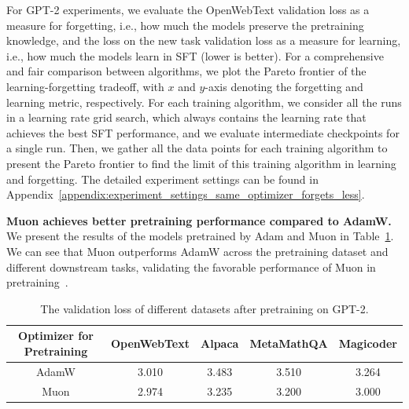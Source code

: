 \documentclass{article}
\theoremstyle{remark}
\begin{document}
For GPT-2 experiments, we evaluate the OpenWebText validation loss as a measure for forgetting, i.e., how much the models preserve the pretraining knowledge, and the loss on the new task validation loss as a measure for learning, i.e., how much the models learn in SFT (lower is better). 
For a comprehensive and fair comparison between algorithms, we plot the Pareto frontier of the learning-forgetting tradeoff, with $x$ and $y$-axis denoting the forgetting and learning metric, respectively. 
For each training algorithm, we consider all the runs in a learning rate grid search, which always contains the learning rate that achieves the best SFT performance, and we evaluate intermediate checkpoints for a single run. Then, we gather all the data points for each training algorithm to present the Pareto frontier to find the limit of this training algorithm in learning and forgetting.
The detailed experiment settings can be found in Appendix~\ref{appendix:experiment_settings_same_optimizer_forgets_less}.










\textbf{Muon achieves better pretraining performance compared to AdamW.} 
We present the results of the models pretrained by Adam and Muon in Table~\ref{tab:pretrain_results}. We can see that Muon outperforms AdamW across the pretraining dataset and different downstream tasks, validating the favorable performance of Muon in pretraining~\citep{jordan2024muon,liu2025muon,wen2025fantastic}.

\begin{table}[H]
    \centering
    \vspace{-0.5cm}
    \caption{The validation loss of different datasets after pretraining on GPT-2.}
    \vspace{0.2cm}
    \label{tab:pretrain_results}
    \begin{tabular}{ccccc}
    \toprule
    Optimizer for Pretraining & OpenWebText & Alpaca & MetaMathQA & Magicoder \\
    \midrule
    AdamW & 3.010 & 3.483 & 3.510 & 3.264 \\
    Muon & 2.974 & 3.235 & 3.200 & 3.000 \\
    \bottomrule
    \end{tabular}
    \vspace{-0.45cm}
\end{table}
\end{document}
